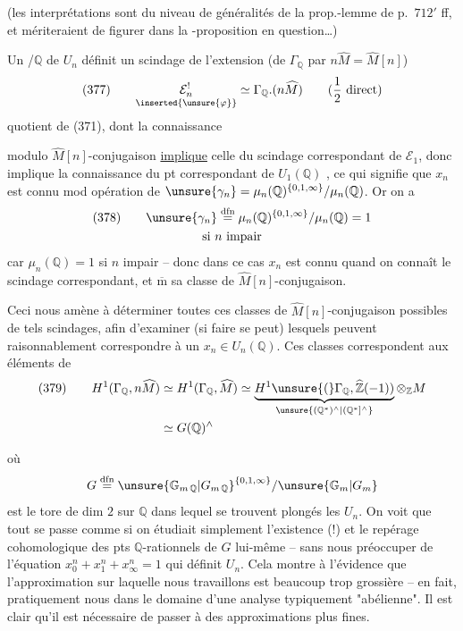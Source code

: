 (les interprétations sont du niveau de généralités de la prop.-lemme de p.~$712'$ ff, et mériteraient de figurer dans la -proposition en question\ldots)

Un   /$\mathbb Q$ de $U_n$ définit un scindage de l'extension (de $\Gamma_{\mathbb Q}$ par $n\widehat M=\widehat M[n]$)
\[
\text{(377)}\qquad \underset{\inserted{\unsure{\varphi}}}{\mathcal E_n^{!}}\simeq\Gamma_{\mathbb Q}.(n\widehat M)
\qquad\text{($\frac12$ direct)}
\]
quotient de (371), dont la connaissance

modulo  $\widehat M[n]$-conjugaison \uline{implique} celle
du scindage correspondant de $\mathcal E_1$, donc
implique la connaissance du pt correspondant 
de $U_1(\mathbb Q)$ , ce qui signifie
que $x_n$ est connu mod opération de
$\unsure{\gamma_n}=\mu_n(\mathbb Q)^{\{0,1,\infty\}}/\mu_n(\mathbb Q)$.
Or on a
\[
\begin{gathered}
\text{(378)}\qquad
\unsure{\gamma_n}\overset{\mathrm{dfn}}=
\mu_n(\mathbb Q)^{\{0,1,\infty\}}/\mu_n(\mathbb Q)=1\\
\text{si }n\text{ impair}
\end{gathered}
\]
car $\mu_n(\mathbb Q)=1$ si $n$ impair -- donc dans
ce cas $x_n$ est connu quand on connaît
le scindage correspondant, et $\overline{\mathrm m}$
 sa classe de $\widehat M[n]$-conjugaison.

Ceci nous amène à déterminer toutes ces
classes de $\widehat M[n]$-conjugaison possibles de
tels scindages, afin d'examiner (si faire se
peut) lesquels peuvent raisonnablement
correspondre à un $x_n\in U_n(\mathbb Q)$. Ces classes
correspondent aux éléments de
\[
\begin{aligned}
\text{(379)}\qquad
H^1(\Gamma_{\mathbb Q},n\widehat M)
&\simeq H^1(\Gamma_{\mathbb Q},\widehat M)
\simeq
\underbrace{H^1\unsure{(}\Gamma_{\mathbb Q},\widehat{\mathbb Z}(-1))}
_{\unsure{(\mathbb Q^*)^\wedge|(\mathbb Q^*]^\wedge}}
\otimes_{\mathbb Z}M\\
&\simeq G(\mathbb Q)^\wedge
\end{aligned}
\]


où
\[
G\overset{\mathrm{dfn}}=
\unsure{\mathbb G_{m\,\mathbb Q}|G_{m\,\mathbb Q}}^{\{0,1,\infty\}}
/\unsure{\mathbb G_m|G_m}
\]
est le tore de dim $2$ sur $\mathbb Q$ dans lequel
se trouvent plongés les $U_n$. On voit que
tout se passe comme si on étudiait
simplement l'existence (!) et le repérage
cohomologique des pts $\mathbb Q$-rationnels de
$G$ lui-même -- sans nous préoccuper
de l'équation $x_0^n+x_1^n+x_\infty^n=1$ qui définit
$U_n$. Cela montre à l'évidence que
l'approximation sur laquelle nous travaillons
est beaucoup trop grossière -- en fait,
pratiquement nous  dans le
domaine d'une analyse typiquement
"abélienne". Il est clair qu'il est
nécessaire de passer à des approximations
plus fines.

